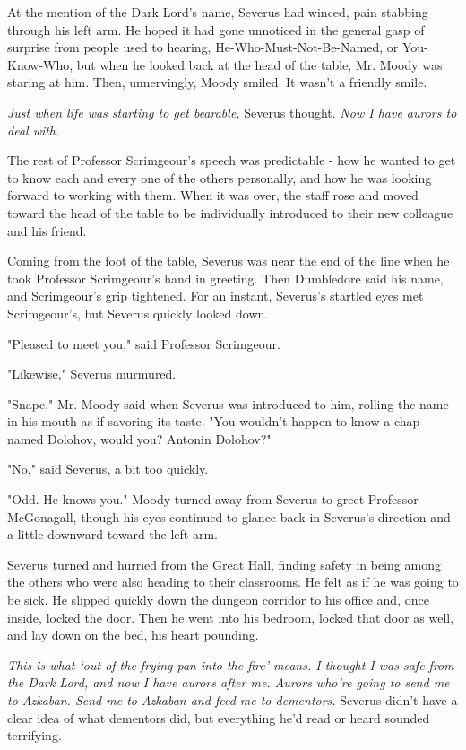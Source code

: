 At the mention of the Dark Lord's name, Severus had winced, pain stabbing through his left arm. He hoped it had gone unnoticed in the general gasp of surprise from people used to hearing, He-Who-Must-Not-Be-Named, or You-Know-Who, but when he looked back at the head of the table, Mr. Moody was staring at him. Then, unnervingly, Moody smiled. It wasn't a friendly smile.

\emph{Just when life was starting to get bearable,} Severus thought. \emph{Now I have aurors to deal with.}

The rest of Professor Scrimgeour's speech was predictable - how he wanted to get to know each and every one of the others personally, and how he was looking forward to working with them. When it was over, the staff rose and moved toward the head of the table to be individually introduced to their new colleague and his friend.

Coming from the foot of the table, Severus was near the end of the line when he took Professor Scrimgeour's hand in greeting. Then Dumbledore said his name, and Scrimgeour's grip tightened. For an instant, Severus's startled eyes met Scrimgeour's, but Severus quickly looked down.

"Pleased to meet you," said Professor Scrimgeour.

"Likewise," Severus murmured.

"Snape," Mr. Moody said when Severus was introduced to him, rolling the name in his mouth as if savoring its taste. "You wouldn't happen to know a chap named Dolohov, would you? Antonin Dolohov?"

"No," said Severus, a bit too quickly.

"Odd. He knows you." Moody turned away from Severus to greet Professor McGonagall, though his eyes continued to glance back in Severus's direction and a little downward toward the left arm.

Severus turned and hurried from the Great Hall, finding safety in being among the others who were also heading to their classrooms. He felt as if he was going to be sick. He slipped quickly down the dungeon corridor to his office and, once inside, locked the door. Then he went into his bedroom, locked that door as well, and lay down on the bed, his heart pounding.

\emph{This is what `out of the frying pan into the fire' means. I thought I was safe from the Dark Lord, and now I have aurors after me. Aurors who're going to send me to Azkaban. Send me to Azkaban and feed me to dementors.} Severus didn't have a clear idea of what dementors did, but everything he'd read or heard sounded terrifying.

